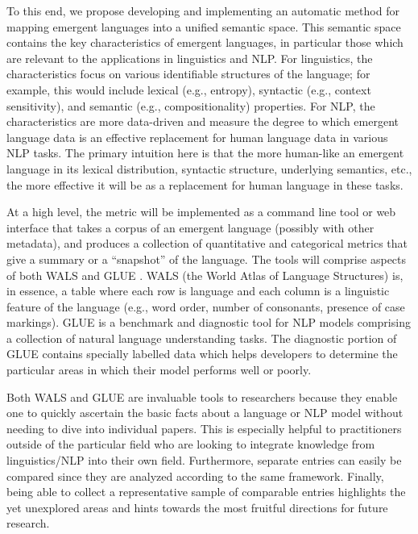 To this end, we propose developing and implementing an automatic method for mapping emergent languages  into a unified semantic space.
This semantic space contains the key characteristics of emergent languages, in particular those which are relevant to the applications in linguistics and NLP.\sentspace{}
For linguistics, the characteristics focus on various identifiable structures of the language; for example, this would include lexical (e.g., entropy), syntactic (e.g., context sensitivity), and semantic (e.g., compositionality) properties.
For NLP, the characteristics are more data-driven and measure the degree to which emergent language data is an effective replacement for human language data in various NLP tasks.
The primary intuition here is that the more human-like an emergent language in its lexical distribution, syntactic structure, underlying semantics, etc., the more effective it will be as a replacement for human language in these tasks.

At a high level, the metric will be implemented as a command line tool or web interface that takes a corpus of an emergent language (possibly with other metadata), and produces a collection of quantitative and categorical metrics that give a summary or a ``snapshot'' of the language.
The tools will comprise aspects of both WALS \citep{wals} and GLUE \citep{wang2018glue}.
WALS (the World Atlas of Language Structures) \citep{wals} is, in essence, a table where each row is language and each column is a linguistic feature of the language (e.g., word order, number of consonants, presence of case markings).
GLUE \citep{wang2018glue} is a benchmark and diagnostic tool for NLP models comprising a collection of natural language understanding tasks.
The diagnostic portion of GLUE contains specially labelled data which helps developers to determine the particular areas in which their model performs well or poorly.

Both WALS and GLUE are invaluable tools to researchers because they enable one to quickly ascertain the basic facts about a language or NLP model without needing to dive into individual papers.
This is especially helpful to practitioners outside of the particular field who are looking to integrate knowledge from linguistics/NLP into their own field.
Furthermore, separate entries can easily be compared since they are analyzed according to the same framework.
Finally, being able to collect a representative sample of comparable entries highlights the yet unexplored areas  and hints towards the most fruitful directions for future research.

